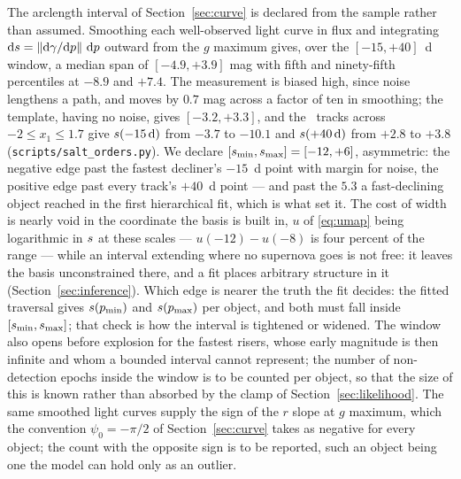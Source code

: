 \documentclass[11pt]{article}
\theoremstyle{plain}
\begin{document}
The arclength interval of Section~\ref{sec:curve} is declared from the sample rather than
assumed. Smoothing each well-observed light curve in flux and integrating
$\mathrm{d}s = \left\| \mathrm{d}\gamma/\mathrm{d}p \right\|\,\mathrm{d}p$ outward from the $g$ maximum gives, over
the $[-15,+40]$~d window, a median span of $[-4.9, +3.9]$ mag with fifth and ninety-fifth
percentiles at $-8.9$ and $+7.4$. The measurement is biased high, since noise lengthens a
path, and moves by $0.7$ mag across a factor of ten in smoothing; the \citet{Hsiao2007}
template, having no noise, gives $[-3.2, +3.3]$, and the \salt\ tracks across
$-2 \leq x_{1} \leq 1.7$ give $s(-15\,\mathrm{d})$ from $-3.7$ to $-10.1$ and
$s(+40\,\mathrm{d})$ from $+2.8$ to $+3.8$ (\texttt{scripts/salt\_orders.py}). We declare
$[s_{\min}, s_{\max}] = [-12, +6]$, asymmetric: the negative edge past the fastest
decliner's $-15$~d point with margin for noise, the positive edge past every track's
$+40$~d point --- and past the $5.3$ a fast-declining object reached in the first
hierarchical fit, which is what set it. The cost of width is nearly void in the coordinate the basis is
built in, $u$ of \eqref{eq:umap} being logarithmic in $s$ at these scales ---
$u(-12) - u(-8)$ is four percent of the range --- while an interval extending where no
supernova goes is not free: it leaves the basis unconstrained there, and a fit
places arbitrary structure in it (Section~\ref{sec:inference}). Which edge is nearer the
truth the fit decides: the fitted traversal gives
$s(p_{\min})$ and $s(p_{\max})$ per object, and both must fall inside
$[s_{\min}, s_{\max}]$; that check is how the interval is tightened or widened. The window also
opens before explosion for the fastest risers, whose early magnitude is then infinite and
whom a bounded interval cannot represent; the number of non-detection epochs inside the
window is to be counted per object, so that the size of this is known rather than absorbed
by the clamp of Section~\ref{sec:likelihood}. The same smoothed light curves supply the
sign of the $r$ slope at $g$ maximum, which the convention $\psi_{0} = -\pi/2$ of
Section~\ref{sec:curve} takes as negative for every object; the count with the opposite
sign is to be reported, such an object being one the model can hold only as an outlier.
\end{document}
